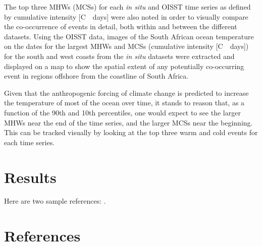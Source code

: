 \documentclass[a4paper,10pt,review]{elsarticle}
\begin{document}
The top three MHWs (MCSs) for each \emph{in situ} and OISST time series as defined by cumulative intensity [\degree C~\texttimes~days] were also noted in order to visually compare the co-occurrence of events in detail, both within and between the different datasets. Using the OISST data, images of the South African ocean temperature on the dates for the largest MHWs and MCSs (cumulative intensity [\degree C~\texttimes~days]) for the south and west coasts from the \emph{in situ} datasets were extracted and displayed on a map to show the spatial extent of any potentially co-occurring event in regions offshore from the coastline of South Africa.

Given that the anthropogenic forcing of climate change is predicted to increase the temperature of most of the ocean over time, it stands to reason that, as a function of the 90th and 10th percentiles, one would expect to see the larger MHWs near the end of the time series, and the larger MCSs near the beginning.  This can be tracked visually by looking at the top three warm and cold events for each time series.

\section{Results}

Here are two sample references: \cite{Feynman1963118,Dirac1953888}.

\section*{References}


\end{document}
